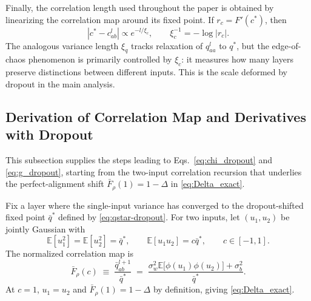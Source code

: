 \documentclass{article}
\theoremstyle{plain}
\theoremstyle{definition}
\theoremstyle{remark}
\begin{document}
Finally, the correlation length used throughout the paper is obtained by linearizing the correlation map around its fixed point. If $r_c=F'(c^*)$, then
\relax
\begin{equation}
|c^*-c^l_{ab}|\propto e^{-l/\xi_c},\qquad \xi_c^{-1}=-\log|r_c|.
\end{equation}
\relax
The analogous variance length $\xi_q$ tracks relaxation of $q^l_{aa}$ to $q^*$, but the edge-of-chaos phenomenon is primarily controlled by $\xi_c$: it measures how many layers preserve distinctions between different inputs. This is the scale deformed by dropout in the main analysis.
\FloatBarrier










\subsection{Derivation of Correlation Map and Derivatives with Dropout}\label{app:price_dropout}

This subsection supplies the steps leading to Eqs.~\eqref{eq:chi_dropout} and \eqref{eq:g_dropout}, starting from the two-input correlation recursion that underlies the perfect-alignment shift \(\bar F_\rho(1)=1-\Delta\) in \eqref{eq:Delta_exact}.


Fix a layer where the single-input variance has converged to the dropout-shifted fixed point \(\bar q^*\) defined by \eqref{eq:qstar-dropout}. For two inputs, let \((u_1,u_2)\) be jointly Gaussian with
\relax
\begin{equation}
\mathbb E[u_1^2]=\mathbb E[u_2^2]=\bar q^*, \qquad \mathbb E[u_1u_2]=c \bar q^*, \qquad c\in[-1,1].
\end{equation}
\relax
The normalized correlation map is
\relax
\begin{equation}
\bar F_\rho(c) \;\equiv\; \frac{\bar q^{l+1}_{ab}}{\bar q^*} \;=\; \frac{\sigma_w^2 \mathbb E\big[\phi(u_1)\phi(u_2)\big]+\sigma_b^2}{\bar q^*}.
\label{eq:Frho_def_app}
\end{equation}
\relax
At \(c=1\), \(u_1=u_2\) and \(\bar F_\rho(1)=1-\Delta\) by definition, giving \eqref{eq:Delta_exact}.
\end{document}
